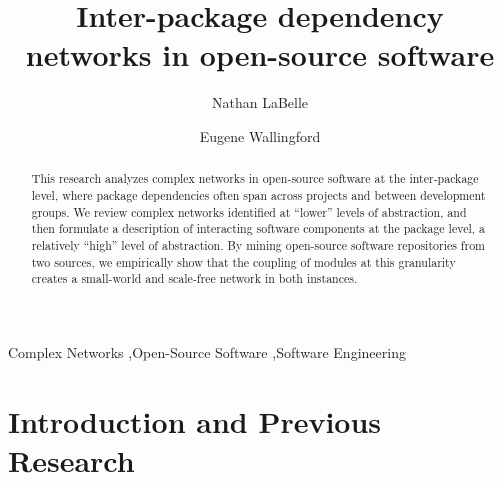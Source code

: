 \documentclass{elsart}
\begin{document}
\begin{frontmatter}



\title{Inter-package dependency networks in open-source software}


\author[UNI]{Nathan LaBelle}
\author[UNI]{Eugene Wallingford}



\address[UNI]{Computer Science Department, University of Northern Iowa, Cedar Falls, Iowa 50613}

\begin{abstract}
This research analyzes complex networks in open-source software at the inter-package level, where package 
dependencies often span across projects and between development groups. We review complex networks identified at 
``lower'' levels of abstraction, and then formulate a description of interacting software components at the package 
level, a relatively ``high'' level of abstraction. By mining open-source software repositories from two sources, we 
empirically show that the coupling of modules at 
this granularity creates a small-world and scale-free network in both instances. 
\end{abstract}

\begin{keyword}
Complex Networks \sep Open-Source Software \sep Software Engineering

\PACS 
\end{keyword}
\end{frontmatter}

\section{Introduction and Previous Research}
\label{}
\end{document}
